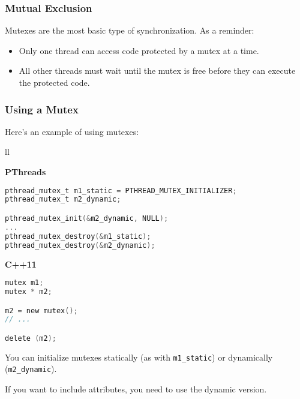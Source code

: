 \begin{frame}
\frametitle{Mutual Exclusion}

Mutexes are the most basic type of synchronization.
As a reminder:
    \begin{itemize}
    \item Only one thread can access code protected by a mutex at a time.
    \item All other threads must wait until the mutex is free before they can
      execute the protected code.
    \end{itemize}


\end{frame}


\begin{frame}[fragile]
\frametitle{Using a Mutex}

  Here's an example of using mutexes:
    
    \begin{tabular}{ll}
      \begin{minipage}{.65\textwidth}
        {\bf PThreads}
{\scriptsize
  \begin{lstlisting}[language=C]
pthread_mutex_t m1_static = PTHREAD_MUTEX_INITIALIZER;
pthread_mutex_t m2_dynamic;

pthread_mutex_init(&m2_dynamic, NULL);
...
pthread_mutex_destroy(&m1_static);
pthread_mutex_destroy(&m2_dynamic);
  \end{lstlisting}
  }
      \end{minipage}
      \begin{minipage}{.35\textwidth}

        {\bf C++11}
{\scriptsize
  \begin{lstlisting}[language=C]
mutex m1;
mutex * m2;

m2 = new mutex();
// ...

delete (m2);
  \end{lstlisting}
  }
      \end{minipage}
    \end{tabular}

You can initialize mutexes statically (as with {\tt m1\_static}) or
dynamically ({\tt m2\_dynamic}). 

If you want to include attributes,
you need to use the dynamic version.

\end{frame}



